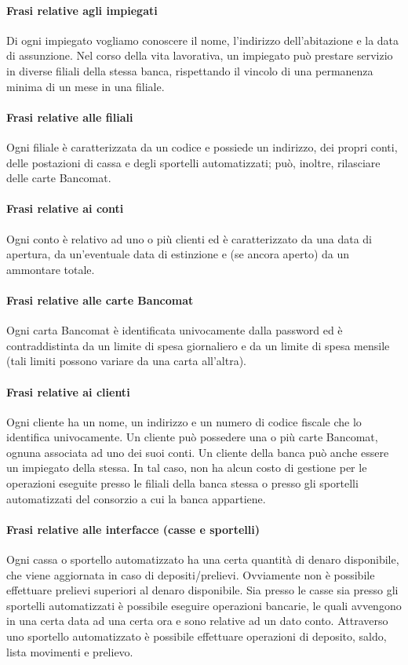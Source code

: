 \paragraph{Frasi relative agli impiegati}
Di ogni impiegato vogliamo conoscere il nome, l'indirizzo dell'abitazione e la data di assunzione. Nel corso della vita lavorativa, un impiegato può prestare servizio in diverse filiali della stessa banca, rispettando il vincolo di una permanenza minima di un mese in una filiale.

\paragraph{Frasi relative alle filiali}
Ogni filiale è caratterizzata da un codice e possiede un indirizzo, dei propri conti, delle postazioni di cassa e degli sportelli automatizzati; può, inoltre, rilasciare delle carte Bancomat.

\paragraph{Frasi relative ai conti}
Ogni conto è relativo ad uno o più clienti ed è caratterizzato da una data di apertura, da un'eventuale data di estinzione e (se ancora aperto) da un ammontare totale.

\paragraph{Frasi relative alle carte Bancomat}
Ogni carta Bancomat è identificata univocamente dalla password ed è contraddistinta da un limite di spesa giornaliero e da un limite di spesa mensile (tali limiti possono variare da una carta all'altra).

\paragraph{Frasi relative ai clienti}
Ogni cliente ha un nome, un indirizzo e un numero di codice fiscale che lo identifica univocamente. Un cliente può possedere una o più carte Bancomat, ognuna associata ad uno dei suoi conti. Un cliente della banca può anche essere un impiegato della stessa. In tal caso, non ha alcun costo di gestione per le operazioni eseguite presso le filiali della banca stessa o presso gli sportelli automatizzati del consorzio a cui la banca appartiene.

\paragraph{Frasi relative alle interfacce (casse e sportelli)}
Ogni cassa o sportello automatizzato ha una certa quantità di denaro disponibile, che viene aggiornata in caso di depositi/prelievi. Ovviamente non è possibile effettuare prelievi superiori al denaro disponibile. Sia presso le casse sia presso gli sportelli automatizzati è possibile eseguire operazioni bancarie, le quali avvengono in una certa data ad una certa ora e sono relative ad un dato conto. Attraverso uno sportello automatizzato è possibile effettuare operazioni di deposito, saldo, lista movimenti e prelievo.


